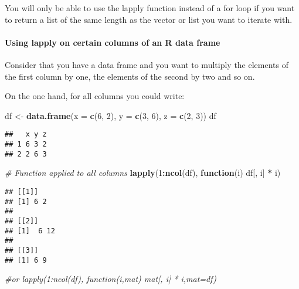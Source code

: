 \documentclass[
]{article}
\newenvironment{Shaded}{\begin{snugshade}}{\end{snugshade}}
\newcommand{\AttributeTok}[1]{\textcolor[rgb]{0.13,0.29,0.53}{#1}}
\newcommand{\CommentTok}[1]{\textcolor[rgb]{0.56,0.35,0.01}{\textit{#1}}}
\newcommand{\ControlFlowTok}[1]{\textcolor[rgb]{0.13,0.29,0.53}{\textbf{#1}}}
\newcommand{\DecValTok}[1]{\textcolor[rgb]{0.00,0.00,0.81}{#1}}
\newcommand{\FunctionTok}[1]{\textcolor[rgb]{0.13,0.29,0.53}{\textbf{#1}}}
\newcommand{\NormalTok}[1]{#1}
\newcommand{\OtherTok}[1]{\textcolor[rgb]{0.56,0.35,0.01}{#1}}
\newcommand{\SpecialCharTok}[1]{\textcolor[rgb]{0.81,0.36,0.00}{\textbf{#1}}}
\begin{document}
You will only be able to use the lapply function instead of a for loop
if you want to return a list of the same length as the vector or list
you want to iterate with.

\hypertarget{using-lapply-on-certain-columns-of-an-r-data-frame}{%
\paragraph{Using lapply on certain columns of an R data
frame}\label{using-lapply-on-certain-columns-of-an-r-data-frame}}

Consider that you have a data frame and you want to multiply the
elements of the first column by one, the elements of the second by two
and so on.

On the one hand, for all columns you could write:

\begin{Shaded}
\begin{Highlighting}[]
\NormalTok{df }\OtherTok{\textless{}{-}} \FunctionTok{data.frame}\NormalTok{(}\AttributeTok{x =} \FunctionTok{c}\NormalTok{(}\DecValTok{6}\NormalTok{, }\DecValTok{2}\NormalTok{), }\AttributeTok{y =} \FunctionTok{c}\NormalTok{(}\DecValTok{3}\NormalTok{, }\DecValTok{6}\NormalTok{), }\AttributeTok{z =} \FunctionTok{c}\NormalTok{(}\DecValTok{2}\NormalTok{, }\DecValTok{3}\NormalTok{))}
\NormalTok{df}
\end{Highlighting}
\end{Shaded}

\begin{verbatim}
##   x y z
## 1 6 3 2
## 2 2 6 3
\end{verbatim}

\begin{Shaded}
\begin{Highlighting}[]
\CommentTok{\# Function applied to all columns}
\FunctionTok{lapply}\NormalTok{(}\DecValTok{1}\SpecialCharTok{:}\FunctionTok{ncol}\NormalTok{(df), }\ControlFlowTok{function}\NormalTok{(i) df[, i] }\SpecialCharTok{*}\NormalTok{ i)}
\end{Highlighting}
\end{Shaded}

\begin{verbatim}
## [[1]]
## [1] 6 2
## 
## [[2]]
## [1]  6 12
## 
## [[3]]
## [1] 6 9
\end{verbatim}

\begin{Shaded}
\begin{Highlighting}[]
\CommentTok{\#or lapply(1:ncol(df), function(i,mat) mat[, i] * i,mat=df)}
\end{Highlighting}
\end{Shaded}
\end{document}
